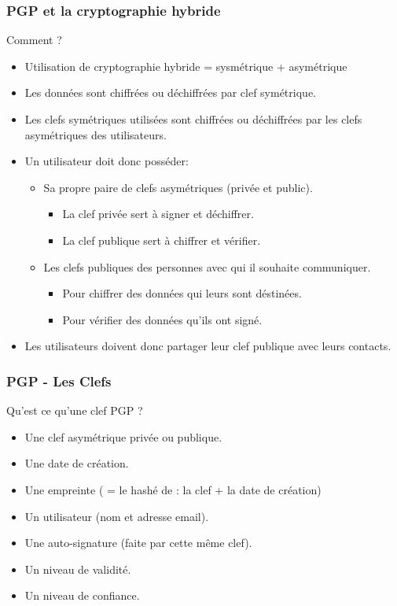 \begin{frame}
    \frametitle{\color{white}PGP et la cryptographie hybride}
    \begin{block}{Comment ?}
    	\begin{itemize}
         \item Utilisation de cryptographie hybride = sysmétrique + asymétrique
         \item Les données sont chiffrées ou déchiffrées par clef symétrique.
	 \item Les clefs symétriques utilisées sont chiffrées ou déchiffrées par les clefs asymétriques des utilisateurs.
         \item Un utilisateur doit donc posséder:
	  \begin{itemize}
	    \item Sa propre paire de clefs asymétriques (privée et public).
	    \begin{itemize}
	      \item La clef privée sert à signer et déchiffrer.
	      \item La clef publique sert à chiffrer et vérifier.
	    \end{itemize}
	    \item Les clefs publiques des personnes avec qui il souhaite communiquer.
	    \begin{itemize}
	      \item Pour chiffrer des données qui leurs sont déstinées.
	      \item Pour vérifier des données qu'ils ont signé.
	    \end{itemize}
	  \end{itemize}
	 \item Les utilisateurs doivent donc partager leur clef publique avec leurs contacts.
       \end{itemize} 
    \end{block}
\end{frame}

\begin{frame}
    \frametitle{\color{white}PGP - Les Clefs}
    \begin{block}{Qu'est ce qu'une clef PGP ?}
    	\begin{itemize}
	  \item Une clef asymétrique privée ou publique.
	  \item Une date de création.
	  \item Une empreinte ( = le hashé de : la clef + la date de création)
	  \item Un utilisateur (nom et adresse email).
	  \item Une auto-signature (faite par cette même clef).
	  \item Un niveau de validité.
	  \item Un niveau de confiance.
       \end{itemize} 
    \end{block}
\end{frame}

